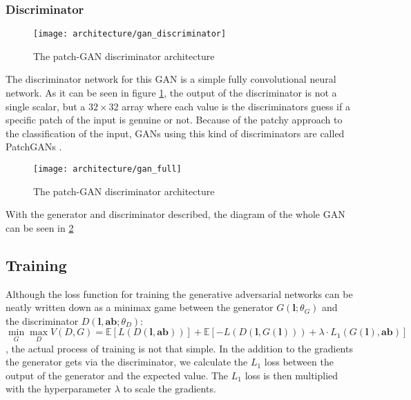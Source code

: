 \subsubsection{Discriminator}

\begin{figure}[!ht]
	\centering
	\texttt{[image: architecture/gan\_discriminator]}
    \caption{The patch-GAN discriminator architecture}
	\label{fig:architecture_gan_discriminator}
\end{figure}

The discriminator network for this GAN is a simple fully convolutional neural network.
As it can be seen in figure \ref{fig:architecture_gan_discriminator}, the output
of the discriminator is not a single scalar, but a $32\times32$ array
where each value is the discriminators guess if a specific patch of the input is 
genuine or not. Because of the patchy approach to the classification of the input, 
GANs using this kind of discriminators are called PatchGANs \citep{isola2017pix2pix}.

\begin{figure}[!ht]
	\centering
	\texttt{[image: architecture/gan\_full]}
    \caption{The patch-GAN discriminator architecture}
	\label{fig:architecture_gan_full}
\end{figure}

With the generator and discriminator described, the diagram of the whole GAN can
be seen in \ref{fig:architecture_gan_full}


\subsection{Training}

Although the loss function for training the generative adversarial networks can be neatly 
written down as a minimax game between the generator $G(\mathbf{l};\theta_G)$ and the 
discriminator $D(\mathbf{l, ab};\theta_D)$:
\begin{equation}
	\min_{G}\max_{D}V(D,G)=\mathbb{E}[L(D(\mathbf{l, ab}))] + \mathbb{E}[-L(D(\mathbf{l}, G(\mathbf{l}))) + \lambda \cdot \mathit{L_1}(G(\mathbf{l}), \mathbf{ab})]
\end{equation}
, the actual process of training is not that simple. In the addition to the gradients 
the generator gets via the discriminator, we calculate the $\mathit{L_1}$ loss between
the output of the generator and the expected value. The $\mathit{L_1}$ loss is then 
multiplied with the hyperparameter $\lambda$ to scale the gradients.

